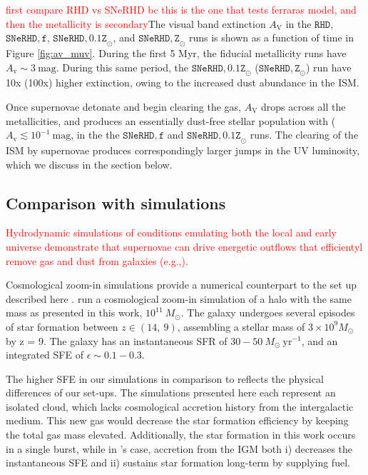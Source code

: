\documentclass[twocolumn,linenumbers]{aastex631}
\begin{document}
{\textcolor{red}{first compare RHD vs SNeRHD bc this is the one that tests ferraras model, and then the metallicity is secondary}The visual band extinction $A_\mathrm{V}$ in the $\mathtt{RHD}$, $\mathtt{SNeRHD,f}$, $ \mathtt{SNeRHD,0.1Z}_\odot$, and $\mathtt{SNeRHD,Z}_\odot$ runs is shown as a function of time in Figure \ref{fig:av_muv}. During the first 5 Myr, the fiducial metallicity runs have $A_\mathrm{v}\sim 3\ \mathrm{mag}$. During this same period, the $\mathtt{SNeRHD,0.1Z}_\odot$ ($\mathtt{SNeRHD,Z}_\odot$) run have 10x (100x) higher extinction, owing to the increased dust abundance in the ISM.

Once supernovae detonate and begin clearing the gas, $A_\mathrm{V}$ drops across all the metallicities, and produces an essentially dust-free stellar population with ($A_\mathrm{v} \lesssim 10^{-1}\ \mathrm{mag}$, in the the $\mathtt{SNeRHD,f}$ and $ \mathtt{SNeRHD,0.1Z}_\odot$ runs.
The clearing of the ISM by supernovae produces correspondingly larger jumps in the UV luminosity, which we discuss in the section below.



\subsection{Comparison with simulations}
\textcolor{red}{Hydrodynamic simulations of conditions emulating both the local and early universe demonstrate that supernovae can drive energetic outflows that efficientyl remove gas and dust from galaxies (e.g.,\citealt{2026ApJ..1000..158C,2018MNRAS.481.3325F}).}

Cosmological zoom-in simulations provide a numerical counterpart to the set up described here \citep{
2025MNRAS.536..988F,2026arXiv260524104S,2026MNRAS.545f2119S,2025MNRAS.540.3350A}. \cite{2025MNRAS.540.3350A} run a cosmological zoom-in simulation of a halo with the same mass as presented in this work, $10^{11}\ M_\odot$. The galaxy undergoes several episodes of star formation between $z \in (14,\ 9)$, assembling a stellar mass of $3 \times 10^9 M_\odot$ by z = 9. The galaxy has an instantaneous SFR of $30-50\ M_\odot \ \mathrm{yr^{-1}}$, and an integrated SFE of $\epsilon \sim 0.1-0.3$.

The higher SFE in our simulations in comparison to \cite{2025MNRAS.540.3350A} reflects the physical differences of our set-ups. The simulations presented here each represent an isolated cloud, which lacks cosmological accretion history from the intergalactic medium. This new gas would decrease the star formation efficiency by keeping the total gas mass elevated. Additionally, the star formation in this work occurs in a single burst, while in \cite{2025MNRAS.540.3350A}'s case, accretion from the IGM both i) decreases the instantaneous SFE and ii) sustains star formation long-term by supplying fuel. 


}
\end{document}
